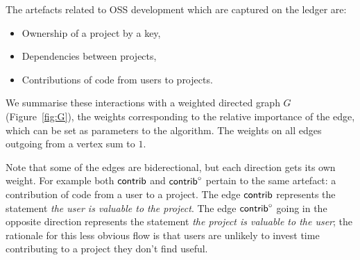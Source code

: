 The artefacts related to OSS development which are captured on the \oscoin{}
ledger are:
\begin{itemize}
  \item Ownership of a project by a key,
  \item Dependencies between projects,
  \item Contributions of code from users to projects.
\end{itemize}


We summarise these interactions with a weighted directed graph $G$
(Figure~\ref{fig:G}), the weights corresponding to the relative importance of
the edge, which can be set as parameters to the algorithm.  The weights on all
edges outgoing from a vertex sum to $1$.

\bigskip

\begin{center}
\end{center}
\medskip


Note that some of the edges are biderectional, but each direction gets
its own weight. For example both $\mathsf{contrib}$ and $\mathsf{contrib}^\circ$ pertain to
the same artefact: a contribution of code from a user to a
project. The edge $\mathsf{contrib}$ represents the statement \emph{the user
  is valuable to the project}. The edge $\mathsf{contrib}^\circ$ going in the
opposite direction represents the statement \emph{the project is
  valuable to the user}; the rationale for this less obvious flow is
that users are unlikely to invest time contributing to a project they
don't find useful.

